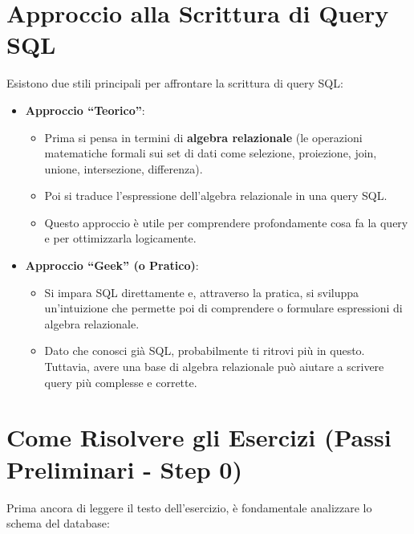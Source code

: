 \section{Approccio alla Scrittura di Query SQL}

Esistono due stili principali per affrontare la scrittura di query SQL:

\begin{itemize}
    \item \textbf{Approccio ``Teorico''}:
    \begin{itemize}
        \item Prima si pensa in termini di \textbf{algebra relazionale} (le operazioni matematiche formali sui set di dati come selezione, proiezione, join, unione, intersezione, differenza).
        \item Poi si traduce l'espressione dell'algebra relazionale in una query SQL.
        \item Questo approccio è utile per comprendere profondamente cosa fa la query e per ottimizzarla logicamente.
    \end{itemize}

    \item \textbf{Approccio ``Geek'' (o Pratico)}:
    \begin{itemize}
        \item Si impara SQL direttamente e, attraverso la pratica, si sviluppa un'intuizione che permette poi di comprendere o formulare espressioni di algebra relazionale.
        \item Dato che conosci già SQL, probabilmente ti ritrovi più in questo. Tuttavia, avere una base di algebra relazionale può aiutare a scrivere query più complesse e corrette.
    \end{itemize}
\end{itemize}\section{Come Risolvere gli Esercizi (Passi Preliminari - Step 0)}

Prima ancora di leggere il testo dell'esercizio, è fondamentale analizzare lo schema del database:

